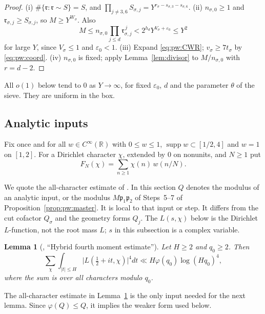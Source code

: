 \documentclass{amsart}
\newtheorem{lemma}{Lemma}[section]
\theoremstyle{definition}
\theoremstyle{plain}
\numberwithin{equation}{section}
\numberwithin{table}{section}
\begin{document}
\begin{proof}
(i) $\#\{\mathfrak r:\mathfrak r\sim S\}=S$, and
$\prod_{j\ne3,6}S_{\sigma,j}=Y^{r_\sigma-s_{\sigma,3}-s_{\sigma,6}}$.
(ii) $n_{\sigma,0}\ge1$ and $\mathfrak r_{\sigma,j}\ge S_{\sigma,j}$, so
$M\ge Y^{W_\sigma}$. Also
\[
 M\le n_{\sigma,0}\prod_{j\le d}\mathfrak r_{\sigma,j}^{\,j}
 <2^{h_d}Y^{V_\sigma+\varepsilon_0}\le Y^2
\]
for large $Y$, since $V_\sigma\le1$ and $\varepsilon_0<1$.
(iii) Expand \eqref{eq:pw:CWR}; $v_\sigma\ge7t_\sigma$ by
\eqref{eq:pw:coord}. (iv) $n_{\sigma,0}$ is fixed; apply
Lemma~\ref{lem:divisor} to $M/n_{\sigma,0}$ with $r=d-2$.
\end{proof}

All $o(1)$ below tend to $0$ as $Y\to\infty$, for fixed $\varepsilon_0$, $d$
and the parameter $\theta$ of the sieve. They are uniform in the box.

\subsection{Analytic inputs}\label{sec:pow3:analytic}

Fix once and for all $w\in C^\infty(\mathbb R)$ with $0\le w\le1$,
$\operatorname{supp}w\subset[1/2,4]$ and $w=1$ on $[1,2]$. For a Dirichlet
character $\chi$, extended by $0$ on nonunits, and $N\ge1$ put
\begin{equation}\label{eq:pw:F}
 F_N(\chi)=\sum_{n\ge1}\chi(n)\,w(n/N).
\end{equation}

We quote the all-character estimate of \cite[Lemma~4]{GMRR}. In this section
$Q$ denotes the modulus of an analytic input, or the modulus
$M\mathfrak p_1\mathfrak p_2$ of Steps~5--7 of
Proposition~\ref{prop:pw:master}. It is local to that input or step. It differs
from the cut cofactor $Q_\sigma$ and the geometry forms $Q_j$.
The $L(s,\chi)$ below is the Dirichlet $L$-function, not the root mass $L$;
$s$ in this subsection is a complex variable.

\begin{lemma}[{\cite[Lemma~4]{GMRR}, ``Hybrid fourth moment estimate''}]\label{lem:pw:gmrr}
Let $H\ge2$ and $q_0\ge2$. Then
\[
 \sum_\chi\int_{|t|\le H}\bigl|L(\tfrac12+it,\chi)\bigr|^4dt\ll H\varphi(q_0)\log(Hq_0)^4,
\]
 where the sum is over all characters modulo $q_0$.
\end{lemma}

The all-character estimate in Lemma~\ref{lem:pw:gmrr} is the only input needed
for the next lemma. Since $\varphi(Q)\le Q$, it implies the weaker form used below.
\end{document}
